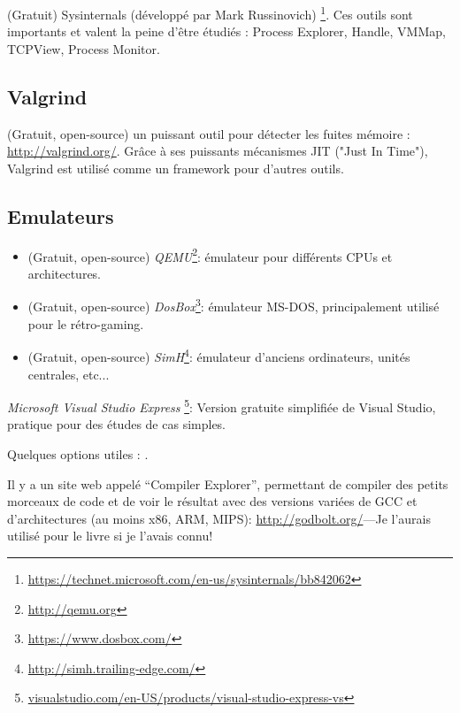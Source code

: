 (Gratuit) Sysinternals (développé par Mark Russinovich)
\footnote{\url{https://technet.microsoft.com/en-us/sysinternals/bb842062}}.
Ces outils sont importants et valent la peine d'être étudiés : Process Explorer, Handle, VMMap, TCPView, Process Monitor.

\subsection{Valgrind}

(Gratuit, open-source) un puissant outil pour détecter les fuites mémoire : \url{http://valgrind.org/}.
Grâce à ses puissants mécanismes \ac{JIT} ("Just In Time"), Valgrind est utilisé comme un framework pour d'autres outils.


\subsection{Emulateurs}

\begin{itemize}
\item (Gratuit, open-source) \emph{QEMU}\footnote{\url{http://qemu.org}}: émulateur pour différents CPUs et architectures.

\item (Gratuit, open-source) \emph{DosBox}\footnote{\url{https://www.dosbox.com/}}: émulateur MS-DOS, principalement utilisé pour le rétro-gaming.

\item (Gratuit, open-source) \emph{SimH}\footnote{\url{http://simh.trailing-edge.com/}}: émulateur d'anciens ordinateurs, unités centrales, etc...
\end{itemize}


\emph{Microsoft Visual Studio Express}
\footnote{\href{http://go.yurichev.com/17034}{visualstudio.com/en-US/products/visual-studio-express-vs}}:
Version gratuite simplifiée de Visual Studio, pratique pour des études de cas simples.

Quelques options utiles : .

Il y a un site web appelé ``Compiler Explorer'', permettant de compiler des petits
morceaux de code et de voir le résultat avec des versions variées de GCC et d'architectures
(au moins x86, ARM, MIPS): \url{http://godbolt.org/}---Je l'aurais utilisé
pour le livre si je l'avais connu!

